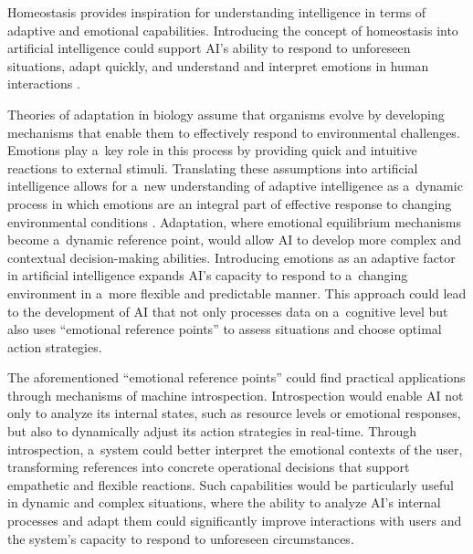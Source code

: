 \documentclass[%
  manuscript=article,
  year=2024,
  volume=77,
  doi=10.59203/zfn.77.706,
]{zfn}
\begin{document}
Homeostasis provides inspiration for understanding intelligence in terms of adaptive and emotional capabilities. Introducing the concept of homeostasis into artificial intelligence could support AI's ability to respond to unforeseen situations, adapt quickly, and understand and interpret emotions in human interactions 
\parencites[][]{gros_emotions_2021}[][]{zhou_emotional_2021}.%
~



Theories of adaptation in biology assume that organisms evolve by developing mechanisms that enable them to effectively respond to environmental challenges. Emotions play a~key role in this process by providing quick and intuitive reactions to external stimuli. Translating these assumptions into artificial intelligence allows for a~new understanding of adaptive intelligence as a~dynamic process in which emotions are an integral part of effective response to changing environmental conditions 
\parencites[][]{assuncao_emotional_2022}[][]{zhao_role_2022}. %
 Adaptation, where emotional equilibrium mechanisms become a~dynamic reference point, would allow AI to develop more complex and contextual decision-making abilities. Introducing emotions as an adaptive factor in artificial intelligence expands AI's capacity to respond to a~changing environment in a~more flexible and predictable manner. This approach could lead to the development of AI that not only processes data on a~cognitive level but also uses ``emotional reference points'' to assess situations and choose optimal action strategies.



The aforementioned ``emotional reference points'' could find practical applications through mechanisms of machine introspection. Introspection would enable AI not only to analyze its internal states, such as resource levels or emotional responses, but also to dynamically adjust its action strategies in real-time. Through introspection, a~system could better interpret the emotional contexts of the user, transforming references into concrete operational decisions that support empathetic and flexible reactions. Such capabilities would be particularly useful in dynamic and complex situations, where the ability to analyze AI's internal processes and adapt them could significantly improve interactions with users and the system's capacity to respond to unforeseen circumstances.
\end{document}
